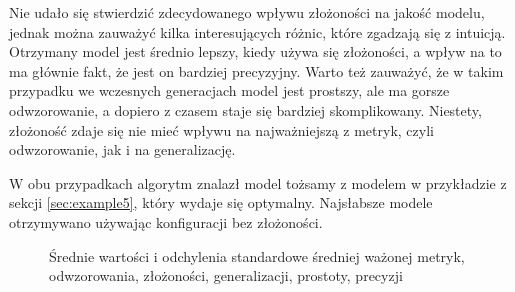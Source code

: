 Nie udało się stwierdzić zdecydowanego wpływu złożoności na jakość modelu, jednak można zauważyć kilka interesujących różnic, które zgadzają się z intuicją. Otrzymany model jest średnio lepszy, kiedy używa się złożoności, a wpływ na to ma głównie fakt, że jest on bardziej precyzyjny. Warto też zauważyć, że w takim przypadku we wczesnych generacjach model jest prostszy, ale ma gorsze odwzorowanie, a dopiero z czasem staje się bardziej skomplikowany. Niestety, złożoność zdaje się nie mieć wpływu na najważniejszą z metryk, czyli odwzorowanie, jak i na generalizację. 

W obu przypadkach algorytm znalazł model tożsamy z modelem w przykładzie z sekcji \ref{sec:example5}, który wydaje się optymalny. Najsłabsze modele otrzymywano używając konfiguracji bez złożoności.


\begin{figure}[H]
	\caption{\label{fig:complexity-summary}Średnie wartości i odchylenia standardowe średniej ważonej metryk, odwzorowania, złożoności, generalizacji, prostoty, precyzji }
\end{figure}

